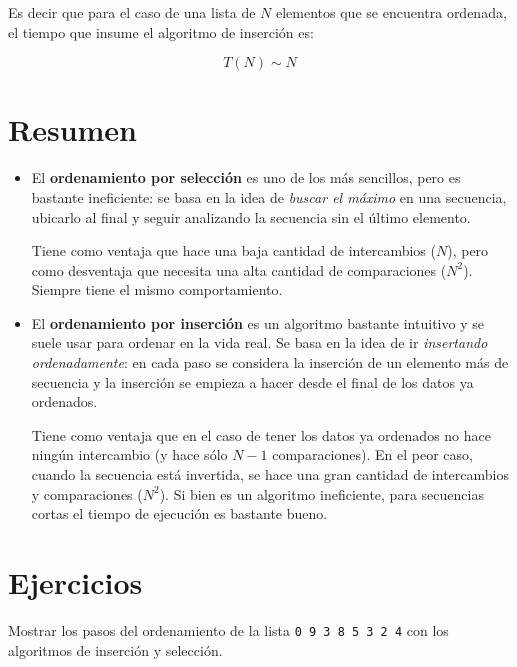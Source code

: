 Es decir que para el caso de una lista de $N$ elementos que se encuentra
ordenada, el tiempo que insume el algoritmo de inserción es:

\begin{equation}
T(N) \sim N
\end{equation}

\section{Resumen}

\begin{itemize}

\item El {\bf ordenamiento por selección} es uno de los más sencillos, pero es
bastante ineficiente: se basa en la idea de \emph{buscar el máximo} en una secuencia,
ubicarlo al final y seguir analizando la secuencia sin el último elemento.

Tiene como ventaja que hace una baja cantidad de intercambios ($N$), pero
como desventaja que necesita una alta cantidad de comparaciones ($N^2$).
Siempre tiene el mismo comportamiento.

\item El {\bf ordenamiento por inserción} es un algoritmo bastante intuitivo y se
suele usar para ordenar en la vida real. Se basa en la idea de ir \emph{insertando
ordenadamente}: en cada paso se considera la inserción de un elemento más de
secuencia y la inserción se empieza a hacer desde el final de los datos ya
ordenados.

Tiene como ventaja que en el caso de tener los datos ya ordenados no hace
ningún intercambio (y hace sólo $N-1$ comparaciones). En el peor caso, cuando
la secuencia está invertida, se hace una gran cantidad de intercambios y
comparaciones ($N^2$). Si bien es un algoritmo ineficiente, para secuencias
cortas el tiempo de ejecución es bastante bueno.

\end{itemize}

\newpage
\section{Ejercicios}

\begin{ejercicio}
Mostrar los pasos del ordenamiento de la lista \lstinline|0 9 3 8 5 3 2 4|
con los algoritmos de inserción y selección.
\end{ejercicio}

